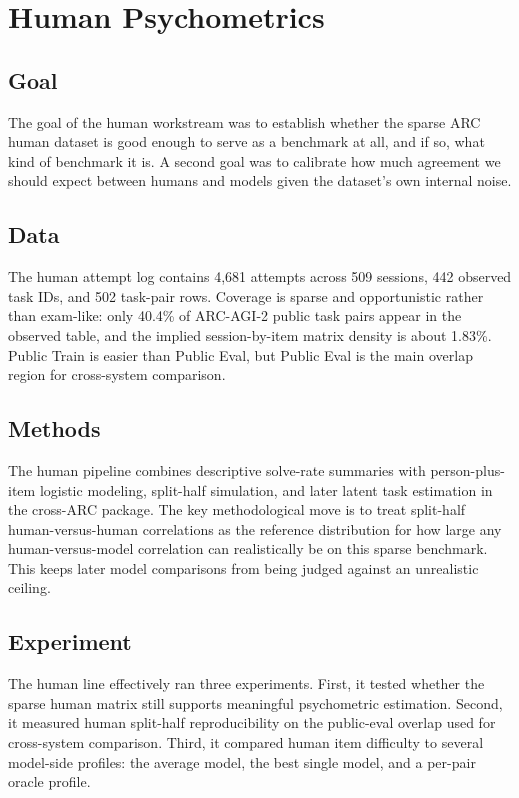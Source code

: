\section{Human Psychometrics}

\subsection{Goal}

The goal of the human workstream was to establish whether the sparse ARC human dataset is good enough to serve as a benchmark at all, and if so, what kind of benchmark it is. A second goal was to calibrate how much agreement we should expect between humans and models given the dataset's own internal noise.

\subsection{Data}

The human attempt log contains 4,681 attempts across 509 sessions, 442 observed task IDs, and 502 task-pair rows. Coverage is sparse and opportunistic rather than exam-like: only 40.4\% of ARC-AGI-2 public task pairs appear in the observed table, and the implied session-by-item matrix density is about 1.83\%. Public Train is easier than Public Eval, but Public Eval is the main overlap region for cross-system comparison.

\subsection{Methods}

The human pipeline combines descriptive solve-rate summaries with person-plus-item logistic modeling, split-half simulation, and later latent task estimation in the cross-ARC package. The key methodological move is to treat split-half human-versus-human correlations as the reference distribution for how large any human-versus-model correlation can realistically be on this sparse benchmark. This keeps later model comparisons from being judged against an unrealistic ceiling.

\subsection{Experiment}

The human line effectively ran three experiments. First, it tested whether the sparse human matrix still supports meaningful psychometric estimation. Second, it measured human split-half reproducibility on the public-eval overlap used for cross-system comparison. Third, it compared human item difficulty to several model-side profiles: the average model, the best single model, and a per-pair oracle profile.

